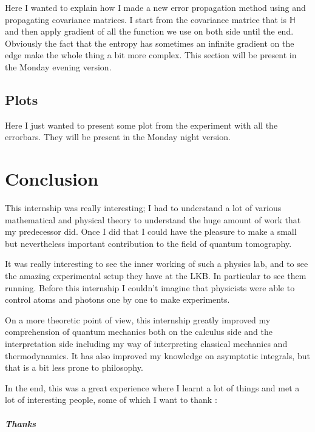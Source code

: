 \documentclass[10pt,a4paper]{report}
\theoremstyle{plain}
\theoremstyle{definition}
\theoremstyle{remark}
\begin{document}
Here I wanted to explain how I made a new error propagation method using and
propagating covariance matrices. I start from the covariance matrice that is
$\mathbb H$ and then apply gradient of all the function we use on both side
until the end. Obviously the fact that the entropy has sometimes an infinite gradient on
the edge make the whole thing a bit more complex. This section will be present
in the Monday evening version.

\section{Plots}

Here I just wanted to present some plot from the experiment with all the
errorbars. They will be present in the Monday night version.

\chapter*{Conclusion} %

This internship was really interesting; I had to understand a lot of various
mathematical and physical theory to understand the huge amount of work that my
predecessor did. Once I did that I could have the pleasure to make a small but
nevertheless important
contribution to the field of quantum tomography.

It was really interesting to see the inner working of such a physics lab, and
to see the amazing experimental setup they have at the LKB. In particular to see
them running. Before
this internship I couldn't imagine that physicists were able to control atoms
and photons one by one to make experiments.

On a more theoretic point of view, this internship greatly improved my
comprehension of quantum mechanics both on the calculus side and the
interpretation side including my way of interpreting classical mechanics and
thermodynamics. It has also improved my knowledge on asymptotic integrals, but
that is a bit less prone to philosophy.

In the end, this was a great experience where I learnt a lot of things and met a lot
of interesting people, some of which I want to thank :

\vfill

\paragraph{\Huge Thanks}
\end{document}

